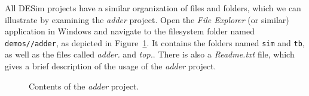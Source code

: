 All DESim projects have a similar organization of files and folders, which we can illustrate
by examining the {\it adder} project. Open the {\it File Explorer} (or similar) application in 
Windows and navigate to the filesystem folder named \texttt{demos/\demos/adder}, as depicted in 
Figure~\ref{fig:adder_files}. It contains the folders named \texttt{sim} and \texttt{tb}, 
as well as the files called {\it adder.\hdlFileExt} and {\it top.\hdlFileExt}. There is also 
a {\it Readme.txt} file, which gives a brief description of the usage of the {\it adder} project.

\begin{figure}[h]
	\begin{center}
        \setlength{\fboxsep}{0pt}
        \ifverilog
            \ifnotSV
            \else
            \fi
        \else
        \fi
	\end{center}
		  \caption{Contents of the {\it adder} project.}
	\label{fig:adder_files}
\end{figure}


